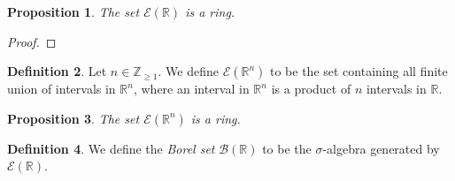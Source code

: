 \documentclass[a4paper, openany]{memoir}
\theoremstyle{definition}
\newtheorem{definition}{Definition}[section]
\theoremstyle{plain}
\newtheorem{proposition}[definition]{Proposition}
\begin{document}
    \begin{proposition}
        The set $\mathcal{E}(\mathbb{R})$ is a ring.
    \end{proposition}
    \begin{proof}
        
    \end{proof}

    \begin{definition}
        Let $n \in \mathbb{Z}_{\geq 1}$. We define $\mathcal{E}(\mathbb{R}^n)$ to be the set containing all finite union of intervals in $\mathbb{R}^n$, where an interval in $\mathbb{R}^n$ is a product of $n$ intervals in $\mathbb{R}$.
    \end{definition}

    \begin{proposition}
        The set $\mathcal{E}(\mathbb{R}^n)$ is a ring.
    \end{proposition}

    \begin{definition}
        We define the \emph{Borel set} $\mathcal{B}(\mathbb{R})$ to be the $\sigma$-algebra generated by $\mathcal{E}(\mathbb{R})$.
    \end{definition}
\end{document}
